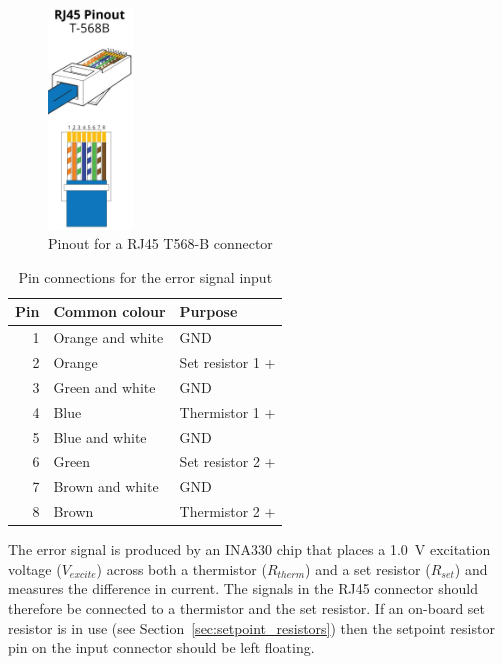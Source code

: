 \documentclass[11pt]{report}
\newcommand{\VExcite}{1.0}
\begin{document}
\begin{figure}
\centering
\includegraphics[width=0.2\textwidth]{RJ45-Pinout-T568B}
\caption[Pinout for a RJ45 T568-B connector]{Pinout for a RJ45 T568-B connector \protect\footnotemark}
\end{figure}


\begin{table}[H]
	
	\centering

	\begin{tabular}{rll}
	\toprule
	Pin & Common colour & Purpose  \\ \midrule
	1   & Orange and white & GND      \\
	2   & Orange & Set resistor 1 +      \\
	3   & Green and white & GND	   \\
	4   & Blue & Thermistor 1 + 	   \\ 
	5   & Blue and white & GND      \\
	6   & Green & Set resistor 2 +      \\
	7   & Brown and white & GND      \\
	8   & Brown & Thermistor 2 +      \\
	\bottomrule
	\end{tabular}

	\caption{Pin connections for the error signal input}
	\label{tab:input_pins}

\end{table}

The error signal is produced by an INA330 chip that places a \SI{\VExcite}{\volt} excitation voltage ($V_{excite}$) across both a thermistor ($R_{therm}$) and a set resistor ($R_{set}$) and measures the difference in current. The signals in the RJ45 connector should therefore be connected to a thermistor and the set resistor. If an on-board set resistor is in use (see Section~\ref{sec:setpoint_resistors}) then the setpoint resistor pin on the input connector should be left floating. 
\end{document}
